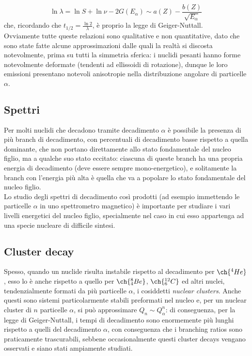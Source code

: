 \begin{equation}
	\ln \lambda = \ln S + \ln \nu - 2 G(E_{\alpha}) \sim a(Z) - \frac{b(Z)}{\sqrt{E_{\alpha}}}
	\label{eq:2.17}
\end{equation}
che, ricordando che $ t_{1/2} = \frac{\ln 2}{\lambda} $, è proprio la legge di Geiger-Nuttall.\\
Ovviamente tutte queste relazioni sono qualitative e non quantitative, dato che sono state fatte alcune approssimazioni dalle quali la realtà si discosta notevolmente, prima su tutti la simmetria sferica: i nuclidi pesanti hanno forme notevolmente deformate (tendenti ad ellissoidi di rotazione), dunque le loro emissioni presentano notevoli anisotropie nella distribuzione angolare di particelle $ \alpha $.

\subsection{Spettri}

Per molti nuclidi che decadono tramite decadimento $ \alpha $ è possibile la presenza di più branch di decadimento, con percentuali di decadimento basse rispetto a quella dominante, che non portano direttamente allo stato fondamentale del nucleo figlio, ma a qualche suo stato eccitato: ciascuna di queste branch ha una propria energia di decadimento (deve essere sempre mono-energetico), e solitamente la branch con l'energia più alta è quella che va a popolare lo stato fondamentale del nucleo figlio.\\
Lo studio degli spettri di decadimento così prodotti (ad esempio immettendo le particelle $ \alpha $ in uno spettrometro magnetico) è importante per studiare i vari livelli energetici del nucleo figlio, specialmente nel caso in cui esso appartenga ad una specie nucleare di difficile sintesi.

\subsection{Cluster decay}

Spesso, quando un nuclide risulta instabile rispetto al decadimento per $ \ch{^4 He} $, esso lo è anche rispetto a quello per $ \ch{^8_4 Be} $, $ \ch{^{12}_6 C} $ ed altri nuclei, tendenzialmente formati da più particelle $ \alpha $, i cosiddetti \textit{nuclear clusters}. Anche questi sono sistemi particolarmente stabili preformati nel nucleo e, per un nuclear cluster di $ n $ particelle $ \alpha $, si può approssimare $ Q_n \sim Q_{\alpha}^n $: di conseguenza, per la legge di Geiger-Nuttall, i tempi di decadimento sono enormemente più lunghi rispetto a quelli del decadimento $ \alpha $, con conseguenza che i branching ratios sono praticamente trascurabili, sebbene occasionalmente questi cluster decays vengano osservati e siano stati ampiamente studiati.

